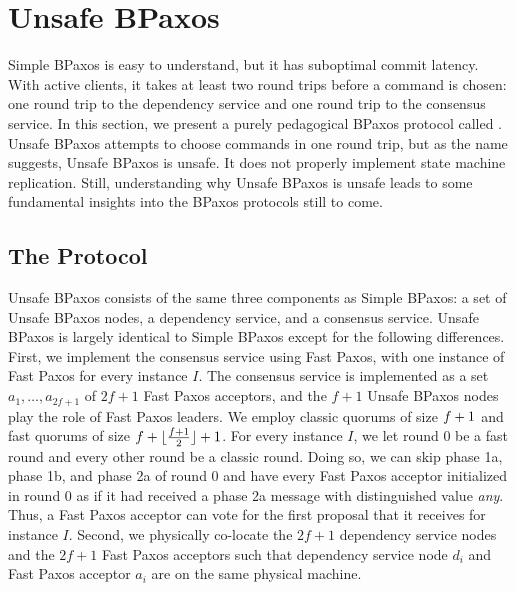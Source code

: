 \section{Unsafe BPaxos}
Simple BPaxos is easy to understand, but it has suboptimal commit latency.
With active clients, it takes at least two round trips before a command is
chosen: one round trip to the dependency service and one round trip to the
consensus service. In this section, we present a purely pedagogical BPaxos
protocol called . Unsafe BPaxos attempts to choose
commands in one round trip, but as the name suggests, Unsafe BPaxos is unsafe.
It does not properly implement state machine replication. Still, understanding
why Unsafe BPaxos is unsafe leads to some fundamental insights into the BPaxos
protocols still to come.

\subsection{The Protocol}
Unsafe BPaxos consists of the same three components as Simple BPaxos: a set of
Unsafe BPaxos nodes, a dependency service, and a consensus service. Unsafe
BPaxos is largely identical to Simple BPaxos except for the following
differences.
%
First, we implement the consensus service using Fast Paxos, with one instance
of Fast Paxos for every instance $I$. The consensus service is implemented as a
set $a_1, \ldots, a_{2f + 1}$ of $2f + 1$ Fast Paxos acceptors, and the $f + 1$
Unsafe BPaxos nodes play the role of Fast Paxos leaders. We employ classic
quorums of size $f + 1$ and fast quorums of size $f + \lfloor\frac{f + 1}{2}\rfloor + 1$. For
every instance $I$, we let round $0$ be a fast round and every other round be a
classic round. Doing so, we can skip phase 1a, phase 1b, and phase 2a of round
$0$ and have every Fast Paxos acceptor initialized in round $0$ as if it had
received a phase 2a message with distinguished value \emph{any}. Thus, a Fast
Paxos acceptor can vote for the first proposal that it receives for instance
$I$.
%
Second, we physically co-locate the $2f + 1$ dependency service nodes and the
$2f + 1$ Fast Paxos acceptors such that dependency service node $d_i$ and Fast
Paxos acceptor $a_i$ are on the same physical machine.

